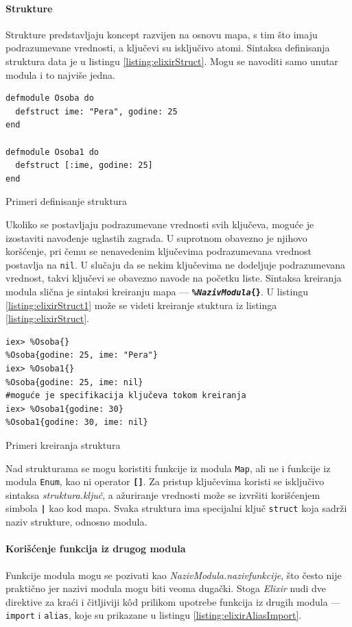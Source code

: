\documentclass[12pt,oneside]{memoir}
\begin{document}
\paragraph{Strukture}
Strukture predstavljaju koncept razvijen na osnovu mapa, s tim što imaju podrazumevane 
vrednosti, a ključevi su isključivo atomi. Sintaksa definisanja struktura data je u listingu
\ref{listing:elixirStruct}. Mogu se navoditi samo unutar modula i to najviše jedna.
\begin{listing}[!h]
\begin{verbatim}
defmodule Osoba do
  defstruct ime: "Pera", godine: 25
end

defmodule Osoba1 do
  defstruct [:ime, godine: 25]
end
\end{verbatim}
\caption{Primeri definisanje struktura}
\label{listing:elixirStruct}
\end{listing}

Ukoliko se postavljaju podrazumevane vrednosti svih ključeva, moguće je izostaviti navođenje
uglastih zagrada. U suprotnom obavezno je njihovo koršćenje, pri čemu se nenavedenim ključevima
podrazumevana vrednost postavlja na \texttt{nil}. U slučaju da se nekim ključevima ne dodeljuje
podrazumevana vrednost, takvi ključevi se obavezno navode na početku liste. Sintaksa kreiranja
modula slična je sintaksi kreiranju mapa --- \texttt{\textbf{\%\emph{NazivModula}\{\}}}. U 
listingu \ref{listing:elixirStruct1} može se videti kreiranje stuktura iz listinga
\ref{listing:elixirStruct}.
\begin{listing}[!h]
\begin{verbatim}
iex> %Osoba{}
%Osoba{godine: 25, ime: "Pera"}
iex> %Osoba1{}
%Osoba{godine: 25, ime: nil}
#moguće je specifikacija ključeva tokom kreiranja
iex> %Osoba1{godine: 30}
%Osoba1{godine: 30, ime: nil}
\end{verbatim}
\caption{Primeri kreiranja struktura}
\label{listing:elixirStruct1}
\end{listing}

Nad strukturama se mogu koristiti funkcije iz modula \texttt{Map}, ali ne i funkcije iz
modula \texttt{Enum}, kao ni operator \texttt{\textbf{[\smallskip]}}. Za pristup ključevima
koristi se isključivo sintaksa \emph{struktura.ključ}, a ažuriranje vrednosti može se izvršiti
korišćenjem simbola \texttt{\textbf{|}} kao kod mapa. Svaka struktura ima specijalni ključ 
\texttt{\textunderscore\textunderscore{}struct\textunderscore\textunderscore} koja sadrži 
naziv strukture, odnosno modula. 

\paragraph{Korišćenje funkcija iz drugog modula}
Funkcije modula mogu se pozivati kao \emph{NazivModula.naziv\textunderscore{}funkcije},
što često nije praktično jer nazivi modula
mogu biti veoma dugački. Stoga \emph{Elixir} nudi dve direktive za kraći i čitljiviji k\^{o}d prilikom
upotrebe funkcija iz drugih modula --- \texttt{import} i \texttt{alias}, koje su prikazane u
listingu \ref{listing:elixirAliasImport}.
\end{document}
